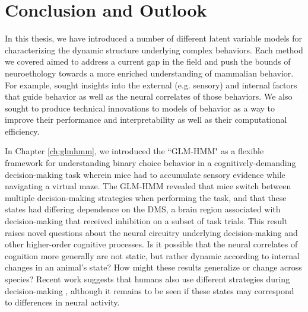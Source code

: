 \chapter{Conclusion and Outlook\label{ch:conclusion}}

In this thesis, we have introduced a number of different latent variable models for characterizing the dynamic structure underlying complex behaviors. Each method we covered aimed to address a current gap in the field and push the bounds of neuroethology towards a more enriched understanding of mammalian behavior. For example, sought insights into the external (e.g. sensory) and internal factors that guide behavior as well as the neural correlates of those behaviors. We also sought to produce technical innovations to models of behavior as a way to improve their performance and interpretability as well as their computational efficiency.

In Chapter \ref{ch:glmhmm}, we introduced the ``GLM-HMM" as a flexible framework for understanding binary choice behavior in a cognitively-demanding decision-making task wherein mice had to accumulate sensory evidence while navigating a virtual maze.  The GLM-HMM revealed that mice switch between multiple decision-making strategies when performing the task, and that these states had differing dependence on the DMS, a brain region associated with decision-making \cite{balleine_role_2007, ding_separate_2012, yartsev_causal_2018, cox_striatal_2019} that received inhibition on a subset of task trials. This result raises novel questions about the neural circuitry underlying decision-making and other higher-order cognitive processes. Is it possible that the neural correlates of cognition more generally are not static, but rather dynamic according to internal changes in an animal's state? How might these results generalize or change across species? Recent work suggests that humans also use different strategies during decision-making \cite{ashwood_mice_2022}, although it remains to be seen if these states may correspond to differences in neural activity. 

